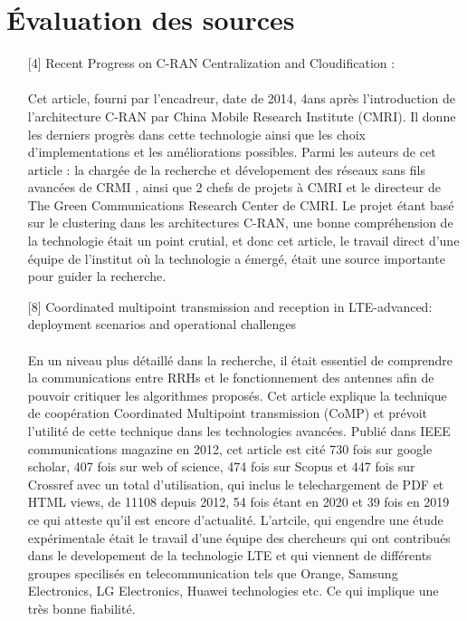 \documentclass{article}
\begin{document}
\section{Évaluation des sources}
\begin{itemize}
  \item [{[4]}] Recent Progress on C-RAN Centralization and Cloudification :
  \paragraph{}

  Cet article, fourni par l’encadreur, date de 2014, 4ans après l’introduction 
  de l’architecture C-RAN par China Mobile Research Institute (CMRI). Il donne les 
  derniers progrès dans cette technologie ainsi que les choix d’implementations et 
  les améliorations possibles. Parmi les auteurs de cet article : la chargée de la 
  recherche et dévelopement des réseaux sans fils avancées de CRMI , ainsi que 2 chefs 
  de projets à CMRI et le directeur de The Green Communications Research Center de CMRI. 
  Le projet étant basé sur le clustering dans les architectures C-RAN, une bonne compréhension 
  de la technologie était un point crutial, et donc cet article, le travail direct d’une équipe 
  de l’institut où la technologie a émergé, était une source importante pour guider la recherche.
  
  \item [{[8]}] Coordinated multipoint transmission and reception in LTE-advanced: deployment scenarios and operational challenges
  \paragraph{}
  En un niveau plus détaillé dans la recherche, il était essentiel de comprendre la communications 
  entre RRHs et le fonctionnement des antennes afin de pouvoir critiquer les algorithmes proposés. Cet article 
  explique la technique de coopération Coordinated Multipoint transmission (CoMP) et prévoit l'utilité 
  de cette technique dans les technologies avancées. Publié dans IEEE communications magazine en 2012, 
  cet article est cité 730 fois sur google scholar, 407 fois sur web of science, 474 fois sur Scopus et 447 fois 
  sur Crossref avec un total d'utilisation, qui inclus le telechargement de PDF et HTML views, de 11108 depuis 
  2012, 54 fois étant en 2020 et 39 fois en 2019 ce qui atteste qu'il est encore d'actualité. L'artcile,
   qui engendre une étude expérimentale était le travail d'une équipe des chercheurs qui ont contribués dans le
   developement de la technologie LTE et qui viennent de différents groupes specilisés en telecommunication tels que 
   Orange, Samsung Electronics, LG Electronics, Huawei technologies etc. Ce qui implique une très bonne fiabilité.
  

\end{itemize}
\end{document}
